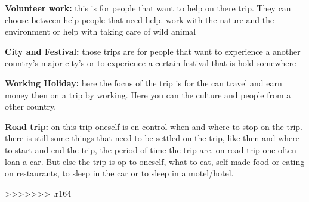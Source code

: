 \textbf{Volunteer work:}
this is for people that want to help on there trip. They can choose between help people that need help. work with the nature and the environment or help with taking care of wild animal

\textbf{City and Festival:}
those trips are for people that want to experience a another country's  major city's or to experience a certain festival that is hold somewhere 

\textbf{Working Holiday:}
here the focus of the trip is for the  can travel and earn money then on a trip by working. Here you can the culture and people from a other country.

\textbf{Road trip:}
on this trip oneself is en control when and where to stop on the trip. there is still some things that need to be settled on the trip, like then and where to start and end the trip, the period of time the trip are. on road trip one often loan a car. But else the trip is op to oneself, what to eat, self made food or eating on restaurants, to sleep in the car or to sleep in a motel/hotel.

>>>>>>> .r164
